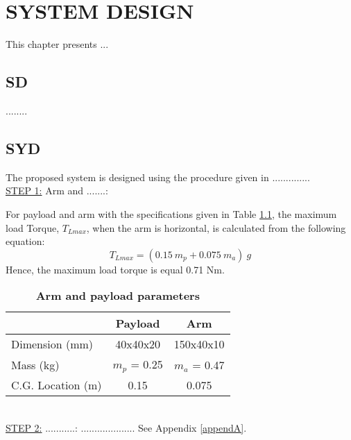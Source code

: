 
\chapter{SYSTEM DESIGN}
\label{chapter:Radar}


\ifpdf
    \graphicspath{{3_SystemDesign/figures/PNG/}{3_SystemDesign/figures/PDF/}{3_SystemDesign/figures/}}
\else
    \graphicspath{{3_SystemDesign/figures/EPS/}{3_SystemDesign/figures/}}
\fi

This chapter presents ...

\section{SD}

........

\section{SYD}
\noindent The proposed system is designed using the procedure given in ..............\\

\underline{STEP 1:} Arm and .......:

For payload and arm with the specifications given in Table \ref{Tabel_Armandpaylaod}, the maximum load Torque, $T_{Lmax}$, when the arm is horizontal, is calculated from the following equation:
\begin{equation}
\label{eqloadtorque}
T_{Lmax} = (0.15\ m_p + 0.075\ m_a)\ g
\end{equation}
Hence, the maximum load torque is equal 0.71 Nm.
\begin{table}[t]
	\caption{\textbf{Arm and payload parameters}}
	\centering
	\label{Tabel_Armandpaylaod}
		\begin{tabular}{|l|c|c|}
			\hline
			& \textbf{Payload} & \textbf{Arm} \\  \hline
			Dimension (mm) & 40x40x20  & 150x40x10 \\  \hline
			Mass (kg) & $m_p$ = 0.25  & $m_a$ = 0.47   \\   \hline
			C.G. Location (m) & 0.15 & 0.075	\\    \hline
		\end{tabular}
\end{table}
\\ 
\underline{STEP 2:} ...........:
.................... See Appendix \ref{appendA}.


